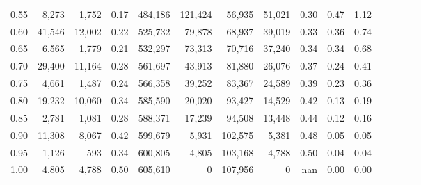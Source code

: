 \begin{tabular}{rrrcrrrrrrrrrrr}
0.55 &   8,273 &   1,752 &                                       0.17 &  484,186 &  121,424 &   56,935 &   51,021 &  0.30 &  0.47 &                         1.12 \\
0.60 &  41,546 &  12,002 &                                       0.22 &  525,732 &   79,878 &   68,937 &   39,019 &  0.33 &  0.36 &                         0.74 \\
0.65 &   6,565 &   1,779 &                                       0.21 &  532,297 &   73,313 &   70,716 &   37,240 &  0.34 &  0.34 &                         0.68 \\
0.70 &  29,400 &  11,164 &                                       0.28 &  561,697 &   43,913 &   81,880 &   26,076 &  0.37 &  0.24 &                         0.41 \\
0.75 &   4,661 &   1,487 &                                       0.24 &  566,358 &   39,252 &   83,367 &   24,589 &  0.39 &  0.23 &                         0.36 \\
0.80 &  19,232 &  10,060 &                                       0.34 &  585,590 &   20,020 &   93,427 &   14,529 &  0.42 &  0.13 &                         0.19 \\
0.85 &   2,781 &   1,081 &                                       0.28 &  588,371 &   17,239 &   94,508 &   13,448 &  0.44 &  0.12 &                         0.16 \\
0.90 &  11,308 &   8,067 &                                       0.42 &  599,679 &    5,931 &  102,575 &    5,381 &  0.48 &  0.05 &                         0.05 \\
0.95 &   1,126 &     593 &                                       0.34 &  600,805 &    4,805 &  103,168 &    4,788 &  0.50 &  0.04 &                         0.04 \\
1.00 &   4,805 &   4,788 &                                       0.50 &  605,610 &        0 &  107,956 &        0 &   nan &  0.00 &                         0.00 \\
\bottomrule
\end{tabular}
